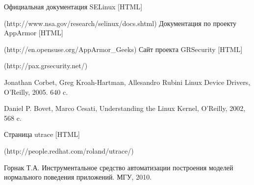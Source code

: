 \begin{thebibliography}{99}
Официальная документация SELinux [HTML] 

(http://www.nsa.gov/research/selinux/docs.shtml)
Документация по проекту AppArmor [HTML]

(http://en.opensuse.org/AppArmor\_Geeks)
Сайт проекта GRSecurity [HTML] 

(http://pax.grsecurity.net/)

Jonathan Corbet, Greg Kroah-Hartman, Allesandro Rubini Linux Device Drivers, O'Reilly, 2005. 640 c.

Daniel P. Bovet, Marco Cesati, Understanding the Linux Kernel, O'Reilly, 2002, 568 c.
 
Страница utrace [HTML] 

(http://people.redhat.com/roland/utrace/)

Горнак Т.А. Инструментальное средство автоматизации построения моделей
нормального поведения приложений. МГУ, 2010.

\end{thebibliography}
